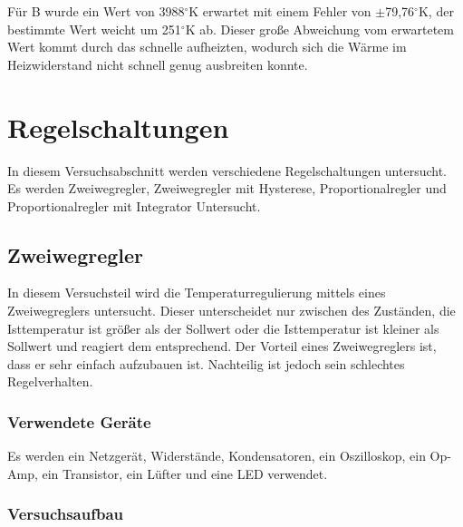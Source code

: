 \documentclass[12pt,a4paper]{article}
\begin{document}
Für B wurde ein Wert von 3988$^\circ$K erwartet mit einem Fehler von $\pm$79,76$^\circ$K, der bestimmte Wert weicht um 251$^\circ$K ab. Dieser große Abweichung vom erwartetem Wert kommt durch das schnelle aufheizten, wodurch sich die Wärme im Heizwiderstand nicht schnell genug ausbreiten konnte.





\section{Regelschaltungen}
In diesem Versuchsabschnitt werden verschiedene Regelschaltungen untersucht. Es werden Zweiwegregler, Zweiwegregler mit Hysterese, Proportionalregler und Proportionalregler mit Integrator Untersucht.

\subsection{Zweiwegregler}

In diesem Versuchsteil wird die Temperaturregulierung mittels eines Zweiwegreglers untersucht. Dieser unterscheidet nur zwischen des Zuständen, die Isttemperatur ist größer als der Sollwert oder die Isttemperatur ist kleiner als Sollwert und reagiert dem entsprechend. Der Vorteil eines Zweiwegreglers ist, dass er sehr einfach aufzubauen ist. Nachteilig ist jedoch sein schlechtes Regelverhalten.

\subsubsection*{Verwendete Geräte}

Es werden ein Netzgerät, Widerstände, Kondensatoren, ein Oszilloskop, ein Op-Amp, ein Transistor, ein Lüfter und eine LED verwendet.


\subsubsection*{Versuchsaufbau}
\end{document}
